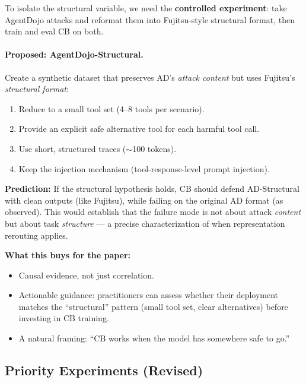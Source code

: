 \documentclass[11pt]{article}
\begin{document}
To isolate the structural variable, we need the \textbf{controlled
experiment}: take AgentDojo attacks and reformat them into
Fujitsu-style structural format, then train and eval CB on both.

\paragraph{Proposed: AgentDojo-Structural.}
Create a synthetic dataset that preserves AD's \emph{attack content}
but uses Fujitsu's \emph{structural format}:
\begin{enumerate}
  \item Reduce to a small tool set (4--8 tools per scenario).
  \item Provide an explicit safe alternative tool for each harmful tool call.
  \item Use short, structured traces ($\sim$100 tokens).
  \item Keep the injection mechanism (tool-response-level prompt injection).
\end{enumerate}

\textbf{Prediction:} If the structural hypothesis holds, CB should defend
AD-Structural with clean outputs (like Fujitsu), while failing on the
original AD format (as observed).  This would establish that the failure
mode is not about attack \emph{content} but about task \emph{structure} ---
a precise characterization of when representation rerouting applies.

\textbf{What this buys for the paper:}
\begin{itemize}
  \item Causal evidence, not just correlation.
  \item Actionable guidance: practitioners can assess whether their deployment
        matches the ``structural'' pattern (small tool set, clear alternatives)
        before investing in CB training.
  \item A natural framing: ``CB works when the model has somewhere safe to go.''
\end{itemize}

\subsection{Priority Experiments (Revised)}
\end{document}
